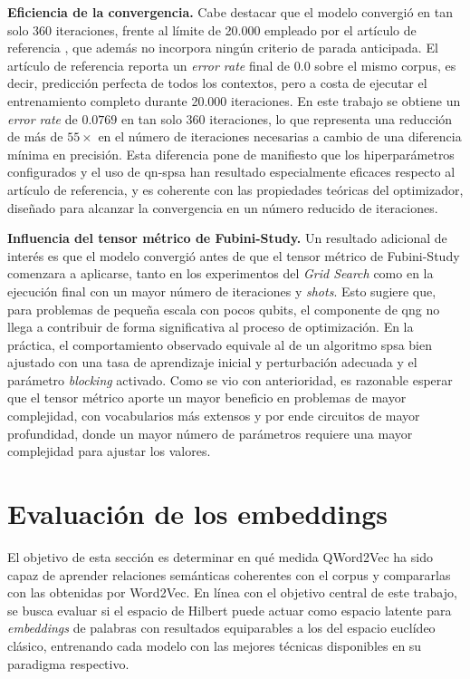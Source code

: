 \textbf{Eficiencia de la convergencia.} Cabe destacar que el modelo convergió en tan solo 360 iteraciones, frente al límite de 20.000 empleado por el artículo de referencia \cite{ohno_qword2vec_2025}, que además no incorpora ningún criterio de parada anticipada. El artículo de referencia reporta un \textit{error rate} final de $0.0$ sobre el mismo corpus, es decir, predicción perfecta de todos los contextos, pero a costa de ejecutar el entrenamiento completo durante 20.000 iteraciones. En este trabajo se obtiene un \textit{error rate} de $0.0769$ en tan solo 360 iteraciones, lo que representa una reducción de más de $55\times$ en el número de iteraciones necesarias a cambio de una diferencia mínima en precisión. Esta diferencia pone de manifiesto que los hiperparámetros configurados y el uso de \gls{qn-spsa} han resultado especialmente eficaces respecto al artículo de referencia, y es coherente con las propiedades teóricas del optimizador, diseñado para alcanzar la convergencia en un número reducido de iteraciones.

\textbf{Influencia del tensor métrico de Fubini-Study.} Un resultado adicional de interés es que el modelo convergió antes de que el tensor métrico de Fubini-Study comenzara a aplicarse, tanto en los experimentos del \textit{Grid Search} como en la ejecución final con un mayor número de iteraciones y \textit{shots}. Esto sugiere que, para problemas de pequeña escala con pocos qubits, el componente de \gls{qng} no llega a contribuir de forma significativa al proceso de optimización. En la práctica, el comportamiento observado equivale al de un algoritmo \gls{spsa} bien ajustado con una tasa de aprendizaje inicial y perturbación adecuada y el parámetro \textit{blocking} activado. Como se vio con anterioridad, es razonable esperar que el tensor métrico aporte un mayor beneficio en problemas de mayor complejidad, con vocabularios más extensos y por ende circuitos de mayor profundidad, donde un mayor número de parámetros requiere una mayor complejidad para ajustar los valores.


\section{Evaluación de los embeddings}

El objetivo de esta sección es determinar en qué medida QWord2Vec ha sido capaz de aprender relaciones semánticas coherentes con el corpus y compararlas con las obtenidas por Word2Vec. En línea con el objetivo central de este trabajo, se busca evaluar si el espacio de Hilbert puede actuar como espacio latente para \textit{embeddings} de palabras con resultados equiparables a los del espacio euclídeo clásico, entrenando cada modelo con las mejores técnicas disponibles en su paradigma respectivo.

